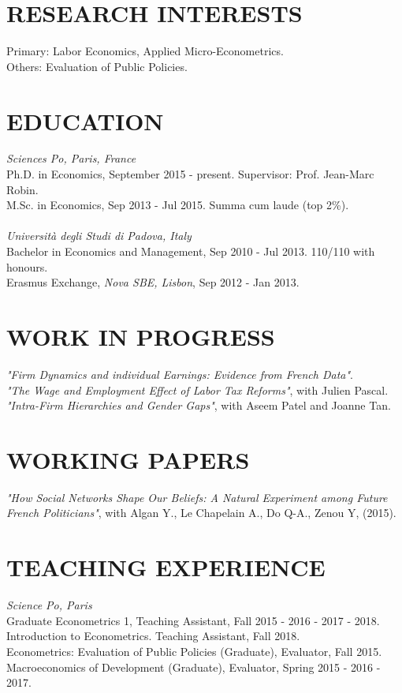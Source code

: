 \documentclass{res}
\begin{document}
\begin{resume}

\section{\small RESEARCH INTERESTS}  
    \vspace{0.02in}	
    Primary: Labor Economics, Applied Micro-Econometrics. \\
    Others: Evaluation of Public Policies. 
 
\section{\small EDUCATION} 
    \vspace{0.02in}	
    \textit{Sciences Po, Paris, France} \\
    Ph.D. in Economics, September 2015 - present. Supervisor: Prof. Jean-Marc Robin.\\
    M.Sc. in Economics, Sep 2013 - Jul 2015. Summa cum laude (top 2\%).\\
    \\[-2pt]        
    \textit{Universit\`{a} degli Studi di Padova, Italy}  \\       
    Bachelor in Economics and Management, Sep 2010 - Jul 2013. 110/110 with honours.\\
    Erasmus Exchange, \textit{Nova SBE, Lisbon}, Sep 2012 - Jan 2013.

\section{\small WORK IN PROGRESS}
\textit{"Firm Dynamics and individual Earnings: Evidence from French Data"}. \\
\textit{"The Wage and Employment Effect of Labor Tax Reforms"}, with Julien Pascal. \\
\textit{"Intra-Firm Hierarchies and Gender Gaps"}, with Aseem Patel and Joanne Tan.

\section{\small WORKING PAPERS}
   \vspace{0.02in}
\textit{"How Social Networks Shape Our Beliefs: A Natural Experiment among Future French Politicians"}, with Algan Y., Le Chapelain A., Do Q-A., Zenou Y, (2015).	
   
\section{\small TEACHING EXPERIENCE}
   \vspace{0.02in}	
   \textit{Science Po, Paris} \\
   Graduate Econometrics 1, Teaching Assistant, Fall 2015 - 2016 - 2017 - 2018. \\
   Introduction to Econometrics. Teaching Assistant, Fall 2018. \\
   Econometrics: Evaluation of Public Policies (Graduate), Evaluator, Fall 2015. \\
   Macroeconomics of Development (Graduate), Evaluator, Spring 2015 - 2016 - 2017.


\end{resume}
\end{document}

